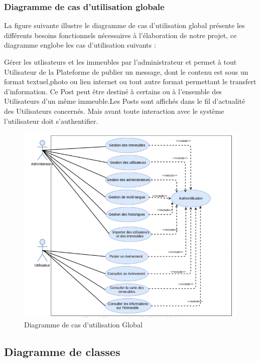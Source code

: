 \documentclass[a4paper,10pt]{book}
\begin{document}
\subsubsection{Diagramme de cas d'utilisation globale }
\par La figure suivante illustre le diagramme de cas d’utilisation global présente les différents besoins fonctionnels nécessaires à l’élaboration de notre projet, ce diagramme englobe les cas d’utilisation suivants : \\
\par Gérer les utlisateurs et les immeubles par l’administrateur
 et permet à tout Utilisateur de la Plateforme de publier un message, dont le contenu est sous un format textuel,photo ou lien internet ou tout autre format permettant le transfert d’information. Ce Post peut être destiné à certains ou à l’ensemble des Utilisateurs d’un même immeuble.Les Posts sont affichés dans le fil d’actualité des Utilisateurs concernés. Mais avant toute interaction avec le système l’utilisateur doit s’authentifier.
\vspace{3cm}
\begin{figure}[!h]
\centering 
\includegraphics[width=1\textwidth]{usecase.png}
\caption{Diagramme de cas d’utilisation Global }
\label{fig4 }
\end{figure}

\subsection{Diagramme de classes  } 
\end{document}
